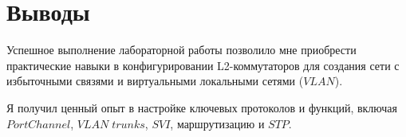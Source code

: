\section{Выводы}
Успешное выполнение лабораторной работы позволило мне приобрести практические навыки в конфигурировании L2-коммутаторов для создания сети с избыточными связями и виртуальными локальными сетями ($VLAN$). 

Я получил ценный опыт в настройке ключевых протоколов и функций, включая $PortChannel$, $VLAN\;trunks$, $SVI$, маршрутизацию и $STP$.
\pagebreak
